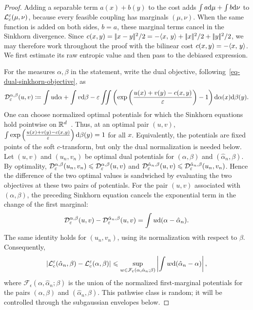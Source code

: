 \begin{proof}
	Adding a separable term \(a(x)+b(y)\) to the cost adds
	$\int a\mathrm{d}\mu+\int b\mathrm{d}\nu$ to $\mathcal{L}_c^\varepsilon(\mu,\nu)$, because every feasible coupling has marginals $(\mu,\nu)$. When the same function is added on both sides, $b=a$, these marginal terms cancel in the Sinkhorn divergence. Since
	$c(x,y)=|\!| x-y |\!|^2/2=-\langle x,\,y\rangle+|\!| x |\!|^2/2+|\!| y |\!|^2/2$, we may therefore work throughout the proof with the bilinear cost $c(x,y)=-\langle x,\,y\rangle$. We first estimate its raw entropic value and then pass to the debiased expression.

	For the measures \(\alpha,\beta\) in the statement, write the dual objective, following~\eqref{eq-dual-sinkhorn-objective}, as
	\[
	\mathcal{D}_\varepsilon^{\alpha,\beta}(u,v)
	\coloneqq
	\int u\mathrm{d}\alpha+\int v\mathrm{d}\beta
	-\varepsilon\iint
	\left(
		\exp\left(\frac{u(x)+v(y)-c(x,y)}{\varepsilon}\right)-1
	\right)
	\mathrm{d}\alpha(x)\mathrm{d}\beta(y).
	\]
	One can choose normalized optimal potentials for which the Sinkhorn equations hold pointwise on \(\mathbb{R}^d\)~\cite{mena2019statistical}. Thus, at an optimal pair \((u,v)\),
	$\int \exp\left(\frac{u(x)+v(y)-c(x,y)}{\varepsilon}\right) \mathrm{d}\beta(y) =1$ for all $x$.
	Equivalently, the potentials are fixed points of the soft \(c\)-transform, but only the dual normalization is needed below.
	Let \((u,v)\) and \((u_n,v_n)\) be optimal dual potentials for \((\alpha,\beta)\) and \((\hat\alpha_n,\beta)\). By optimality,
	$\mathcal{D}_\varepsilon^{\alpha,\beta}(u_n,v_n) \leqslant \mathcal{D}_\varepsilon^{\alpha,\beta}(u,v)$ and $\mathcal{D}_\varepsilon^{\hat\alpha_n,\beta}(u,v) \leqslant \mathcal{D}_\varepsilon^{\hat\alpha_n,\beta}(u_n,v_n)$.
	Hence the difference of the two optimal values is sandwiched by evaluating the two objectives at these two pairs of potentials. For the pair \((u,v)\) associated with \((\alpha,\beta)\), the preceding Sinkhorn equation cancels the exponential term in the change of the first marginal:
	\[
	\mathcal{D}_\varepsilon^{\alpha,\beta}(u,v)
	-
	\mathcal{D}_\varepsilon^{\hat\alpha_n,\beta}(u,v)
	=
	\int u\mathrm{d}(\alpha-\hat\alpha_n).
	\]
	The same identity holds for \((u_n,v_n)\), using its normalization with respect to \(\beta\). Consequently,
	\[
	\left\lvert\mathcal{L}_c^\varepsilon(\hat\alpha_n,\beta)-\mathcal{L}_c^\varepsilon(\alpha,\beta)\right\rvert
	\leqslant
	\sup_{w\in\mathcal F_\varepsilon(\alpha,\hat\alpha_n;\beta)}
	\left\lvert\int w\mathrm{d}(\hat\alpha_n-\alpha)\right\rvert,
	\]
	where \(\mathcal F_\epsilon(\alpha,\hat\alpha_n;\beta)\) is the union of the normalized first-marginal potentials for the pairs \((\alpha,\beta)\) and \((\hat\alpha_n,\beta)\). This pathwise class is random; it will be controlled through the subgaussian envelopes below.


\end{proof}
